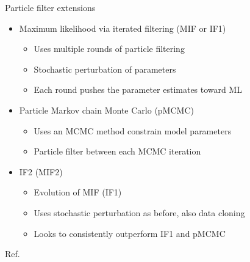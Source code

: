 \documentclass[11pt,compress,aspectratio=1610]{beamer}
\begin{document}
\begin{frame}{Particle filter extensions}
\begin{itemize}
    \item Maximum likelihood via iterated filtering (MIF or IF1)
        \begin{itemize}
            \item Uses multiple rounds of particle filtering
            \item Stochastic perturbation of parameters
            \item Each round pushes the parameter estimates toward ML
        \end{itemize}
    \item Particle Markov chain Monte Carlo (pMCMC)
        \begin{itemize}
            \item Uses an MCMC method constrain model parameters
            \item Particle filter between each MCMC iteration
        \end{itemize}
    \item IF2 (MIF2)
    	\begin{itemize}
    		\item Evolution of MIF (IF1)
    		\item Uses stochastic perturbation as before, also data cloning
    		\item Looks to consistently outperform IF1 and pMCMC
    	\end{itemize}
\end{itemize}
\vfill{\scriptsize Ref. \cite{Ionides2015}\cite{Yang2014} }
\end{frame}
\end{document}
